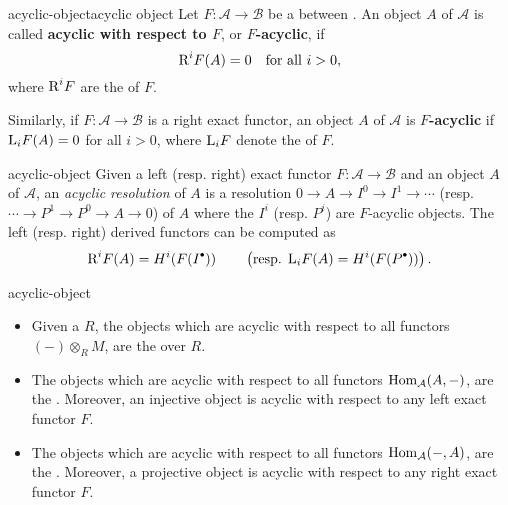 \begin{topic}{acyclic-object}{acyclic object}
    Let $F : \mathcal{A} \to \mathcal{B}$ be a  between . An object $A$ of $\mathcal{A}$ is called \textbf{acyclic with respect to $F$}, or \textbf{$F$-acyclic}, if
    \[ \textup{R}^iF(A) = 0 \quad \textup{for all } i > 0, \]
    where $\textup{R}^i F$ are the  of $F$.
    
    Similarly, if $F : \mathcal{A} \to \mathcal{B}$ is a right exact functor, an object $A$ of $\mathcal{A}$ is \textbf{$F$-acyclic} if $\textup{L}_i F(A) = 0$ for all $i > 0$, where $\textup{L}_i F$ denote the  of $F$.
\end{topic}

\begin{example}{acyclic-object}
    Given a left (resp. right) exact functor $F : \mathcal{A} \to \mathcal{B}$ and an object $A$ of $\mathcal{A}$, an \textit{acyclic resolution} of $A$ is a resolution $0 \to A \to I^0 \to I^1 \to \cdots$ (resp. $\cdots \to P^1 \to P^0 \to A \to 0$) of $A$ where the $I^i$ (resp. $P^i$) are $F$-acyclic objects. The left (resp. right) derived functors can be computed as
    \[ \textup{R}^i F(A) = H^i(F(I^\bdot)) \qquad \left(\textup{resp. } \textup{L}_i F(A) = H^i(F(P^\bdot)) \right) . \]
\end{example}

\begin{example}{acyclic-object}
    \begin{itemize}
        \item Given a  $R$, the objects which are acyclic with respect to all functors $(-) \otimes_R M$, are the  over $R$.
        \item The objects which are acyclic with respect to all functors $\text{Hom}_\mathcal{A}(A, -)$, are the . Moreover, an injective object is acyclic with respect to any left exact functor $F$.
        \item The objects which are acyclic with respect to all functors $\text{Hom}_\mathcal{A}(-, A)$, are the . Moreover, a projective object is acyclic with respect to any right exact functor $F$.
    \end{itemize}
\end{example}

